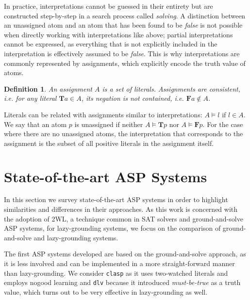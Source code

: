 \documentclass[final]{vutinfth} %
\newtheorem{definition}{Definition}[chapter]
\newcommand{\mbt}{must-be-true\xspace}
\newcommand{\ass}{A}
\newcommand{\bT}{\mathbf{T}}
\newcommand{\bF}{\mathbf{F}}
\newcommand{\clasp}{\texttt{clasp}\xspace}
\newcommand{\dlv}{\texttt{dlv}\xspace}
\begin{document}
In practice, interpretations cannot be guessed in their entirety but are constructed step-by-step in a search process called \emph{solving}. A distinction between an unassigned atom and an atom that has been found to be \emph{false} is not possible when directly working with interpretations like above; partial interpretations cannot be expressed, as everything that is not explicitly included in the interpretation is effectively assumed to be \emph{false}. This is why interpretations are commonly represented by assignments, which explicitly encode the truth value of atoms.

\begin{definition}
An \emph{assignment} $\ass$ is a set of literals. Assignments are consistent, i.e. for any literal $\bT a \in \ass$, its negation is not contained, i.e. $\bF a \not \in \ass$.
\end{definition}

Literals can be related with assignments similar to interpretations: $A \models l$ if $l \in A$. We say that an atom $p$ is unassigned if neither $A \models \bT p$ nor $A \models \bF p$. For the case where there are no unassigned atoms, the interpretation that corresponds to the assignment is the subset of all positive literals in the assignment itself.


\section{State-of-the-art ASP Systems}

In this section we survey state-of-the-art ASP systems in order to highlight similarities and differences in their approaches. As this work is concerned with the adoption of 2WL, a technique common in SAT solvers and ground-and-solve ASP systems, for lazy-grounding systems, we focus on the comparison of ground-and-solve and lazy-grounding systems.

The first ASP systems developed are based on the ground-and-solve approach, as it is less involved and can be implemented in a more straight-forward manner than lazy-grounding. We consider \clasp as it uses two-watched literals and employs nogood learning and \dlv because it introduced \emph{\mbt} as a truth value, which turns out to be very effective in lazy-grounding as well.
\end{document}
